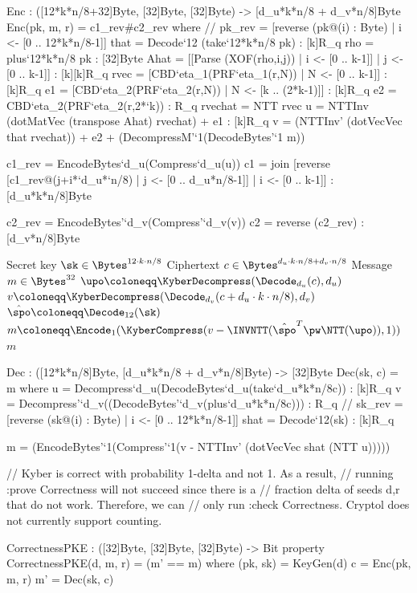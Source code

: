\begin{code}
  Enc : ([12*k*n/8+32]Byte, [32]Byte, [32]Byte) -> [d_u*k*n/8 + d_v*n/8]Byte
  Enc(pk, m, r) = c1_rev#c2_rev where
    // pk_rev = [reverse (pk@(i) : Byte) | i <- [0 .. 12*k*n/8-1]]
    that = Decode`{12} (take`{12*k*n/8} pk) : [k]R_q
    rho = plus`{12*k*n/8} pk : [32]Byte
    Ahat = [[Parse (XOF(rho,i,j)) | i <- [0 .. k-1]] | j <- [0 .. k-1]] : [k][k]R_q
    rvec = [CBD`{eta_1}(PRF`{eta_1}(r,N)) | N <- [0 .. k-1]] : [k]R_q
    e1 = [CBD`{eta_2}(PRF`{eta_2}(r,N)) | N <- [k .. (2*k-1)]] : [k]R_q
    e2 = CBD`{eta_2}(PRF`{eta_2}(r,2*`k)) : R_q
    rvechat = NTT rvec
    u = NTTInv (dotMatVec (transpose Ahat) rvechat) + e1 : [k]R_q
    v = (NTTInv' (dotVecVec that rvechat)) + e2 + (DecompressM'`{1}(DecodeBytes'`{1} m))

    c1_rev = EncodeBytes`{d_u}(Compress`{d_u}(u))
    c1 = join [reverse [c1_rev@(j+i*`d_u*`n/8) | j <- [0 .. d_u*n/8-1]] | i <- [0 .. k-1]] : [d_u*k*n/8]Byte
    
    c2_rev = EncodeBytes'`{d_v}(Compress'`{d_v}(v))
    c2 = reverse (c2_rev) : [d_v*n/8]Byte    
\end{code}

\begin{algorithm}
  \caption{$\KyberCPAPKE.\PKEDec(\sk,c)$: decryption\label{kybercpa-dec}}
  \begin{algorithmic}[1]
    \Require Secret key $\sk \in \Bytes^{12\cdot k\cdot n/8}$
    \Require Ciphertext $c \in \Bytes^{d_u\cdot k\cdot n/8 + d_v\cdot n/8}$
    \Ensure Message $m \in \Bytes^{32}$
    \State $\upo \coloneqq \KyberDecompress(\Decode_{d_u}(c),d_u)$
    \State $v \coloneqq \KyberDecompress(\Decode_{d_v}(c+d_u\cdot k\cdot n/8),d_v)$
    \State $\hat{\spo} \coloneqq \Decode_{12}(\sk)$
    \State $m \coloneqq \Encode_1(\KyberCompress(v-\INVNTT(\hat{\spo}^T\pw\NTT(\upo)),1))$ \label{line:decrypt} 
    \State \Return $m$
\end{algorithmic}
\end{algorithm}

\begin{code}
  Dec : ([12*k*n/8]Byte, [d_u*k*n/8 + d_v*n/8]Byte) -> [32]Byte
  Dec(sk, c) = m where
    u = Decompress`{d_u}(DecodeBytes`{d_u}(take`{d_u*k*n/8}c))   : [k]R_q
    v = Decompress'`{d_v}((DecodeBytes'`{d_v}(plus`{d_u*k*n/8}c))) : R_q
    // sk_rev = [reverse (sk@(i) : Byte) | i <- [0 .. 12*k*n/8-1]]
    shat = Decode`{12}(sk) : [k]R_q

    m = (EncodeBytes'`{1}(Compress'`{1}(v - NTTInv' (dotVecVec shat (NTT u)))))

  // Kyber is correct with probability 1-delta and not 1. As a result,
  // running :prove Correctness will not succeed since there is a 
  // fraction delta of seeds d,r that do not work. Therefore, we can 
  // only run :check Correctness. Cryptol does not currently support counting.

  CorrectnessPKE : ([32]Byte, [32]Byte, [32]Byte) -> Bit
  property CorrectnessPKE(d, m, r) = (m' == m) where
    (pk, sk) = KeyGen(d)
    c = Enc(pk, m, r)
    m' = Dec(sk, c)
\end{code}

